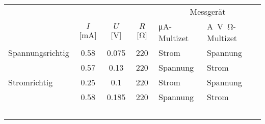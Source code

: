 \begin{tabular}{lcccll}
	\toprule
	\multicolumn{4}{c}{ }&\multicolumn{2}{c}{Messgerät}\\ \cmidrule(r){5-6}
 \rowcolor{white}&$I$ [\si{\milli\ampere}]&$U$ [\si{\volt}]&$R$ 
[\si{\ohm}]&\si{\micro\ampere}-Multizet&\si{\ampere\volt\ohm}-Multizet\\
\midrule
Spannungsrichtig&0.58&0.075&220&Strom&Spannung\\
&0.57&0.13&220&Spannung&Strom\\
Stromrichtig&0.25&0.1&220&Strom&Spannung\\
&0.58&0.185&220&Spannung&Strom\\
\bottomrule\
\end{tabular}
